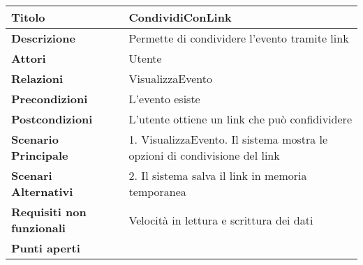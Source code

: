 \begin{tabular} {|P{4.5cm}|P{11cm}|}
  \hline
  \textbf{Titolo}                   & CondividiConLink                                  \\
  \hline
  \textbf{Descrizione}              & Permette di condividere l'evento tramite link     \\
  \hline
  \textbf{Attori}                   & Utente                                            \\
  \hline
  \textbf{Relazioni}                & VisualizzaEvento                                  \\
  \hline
  \textbf{Precondizioni}            & L'evento esiste                                   \\
  \hline
  \textbf{Postcondizioni}           & L'utente ottiene un link che può confidividere    \\
  \hline
  \textbf{Scenario Principale}      & 1. VisualizzaEvento. Il sistema mostra le opzioni di condivisione del link                              \\
  \hline
  \textbf{Scenari Alternativi}      & 2. Il sistema salva il link in memoria temporanea \\
  \hline
  \textbf{Requisiti non funzionali} & Velocità in lettura e scrittura dei dati          \\
  \hline
  \textbf{Punti aperti}             &                                                   \\
  \hline
\end{tabular}
\hfill
\break

